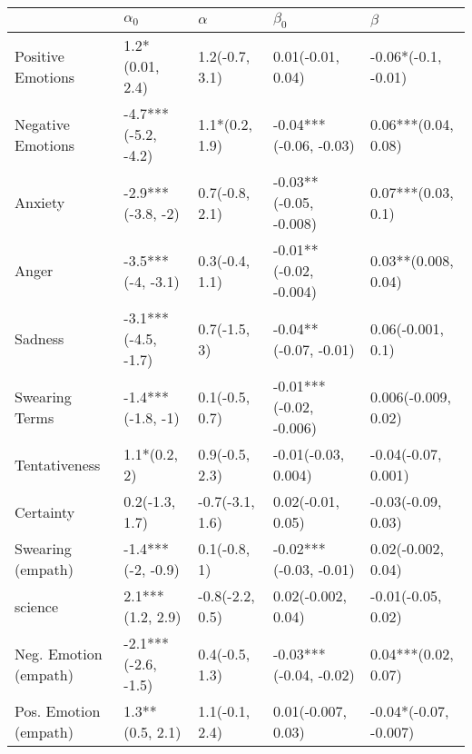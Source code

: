 \begin{tabular}{lllll}
\toprule
{} &           $\alpha_0$ &         $\alpha$ &                $\beta_0$ &                $\beta$ \\
\midrule
Positive Emotions     &      1.2*(0.01, 2.4) &   1.2(-0.7, 3.1) &        0.01(-0.01, 0.04) &    -0.06*(-0.1, -0.01) \\
Negative Emotions     &  -4.7***(-5.2, -4.2) &   1.1*(0.2, 1.9) &   -0.04***(-0.06, -0.03) &    0.06***(0.04, 0.08) \\
Anxiety               &    -2.9***(-3.8, -2) &   0.7(-0.8, 2.1) &   -0.03**(-0.05, -0.008) &     0.07***(0.03, 0.1) \\
Anger                 &    -3.5***(-4, -3.1) &   0.3(-0.4, 1.1) &   -0.01**(-0.02, -0.004) &    0.03**(0.008, 0.04) \\
Sadness               &  -3.1***(-4.5, -1.7) &     0.7(-1.5, 3) &    -0.04**(-0.07, -0.01) &      0.06(-0.001, 0.1) \\
Swearing Terms        &    -1.4***(-1.8, -1) &   0.1(-0.5, 0.7) &  -0.01***(-0.02, -0.006) &    0.006(-0.009, 0.02) \\
Tentativeness         &         1.1*(0.2, 2) &   0.9(-0.5, 2.3) &      -0.01(-0.03, 0.004) &    -0.04(-0.07, 0.001) \\
Certainty             &       0.2(-1.3, 1.7) &  -0.7(-3.1, 1.6) &        0.02(-0.01, 0.05) &     -0.03(-0.09, 0.03) \\
Swearing (empath)     &    -1.4***(-2, -0.9) &     0.1(-0.8, 1) &   -0.02***(-0.03, -0.01) &     0.02(-0.002, 0.04) \\
science               &     2.1***(1.2, 2.9) &  -0.8(-2.2, 0.5) &       0.02(-0.002, 0.04) &     -0.01(-0.05, 0.02) \\
Neg. Emotion (empath) &  -2.1***(-2.6, -1.5) &   0.4(-0.5, 1.3) &   -0.03***(-0.04, -0.02) &    0.04***(0.02, 0.07) \\
Pos. Emotion (empath) &      1.3**(0.5, 2.1) &   1.1(-0.1, 2.4) &       0.01(-0.007, 0.03) &  -0.04*(-0.07, -0.007) \\
\bottomrule
\end{tabular}
